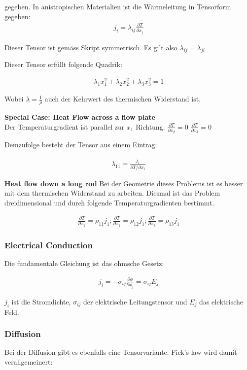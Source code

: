 \documentclass[a4paper]{scrartcl}
\begin{document}
gegeben. In anistropischen Materialien ist die Wärmeleitung in Tensorform
gegeben:
\begin{align}
j_i=\lambda_{ij}\frac{\partial T}{\partial x_j}
\end{align}

Dieser Tensor ist gemäss Skript symmetrisch. Es gilt also
$\lambda_{ij}=\lambda_{ji}$

Dieser Tensor erfüllt folgende Quadrik:

\begin{align}
\lambda_1 x_1^2+\lambda_2 x_2^2+\lambda_3 x_3^2=1
\end{align}

Wobei $\lambda=\frac{1}{\rho}$ auch der Kehrwert des thermischen Widerstand ist.

\textbf{Special Case: Heat Flow across a flow plate} \\
Der Temperaturgradient ist parallel zur $x_1$ Richtung. $\frac{\partial
T}{\partial x_2}=0$ $\frac{\partial T}{\partial x_3}=0$

Demzufolge besteht der Tensor aus einem Eintrag:

\begin{align}
\lambda_{11}=\frac{j_1}{\partial T/ \partial x_1}
\end{align}

\textbf{Heat flow down a long rod}
Bei der Geometrie dieses Problems ist es besser mit dem thermischen Widerstand
zu arbeiten. Diesmal ist das Problem dreidimensional und durch folgende
Temperaturgradienten bestimmt.

\begin{align}
\frac{\partial T}{\partial x_1}=\rho_{11}j_1; \frac{\partial T}{\partial
x_2}=\rho_{12}j_1; \frac{\partial T}{\partial x_3}=\rho_{13}j_1
\end{align}

\subsubsection{Electrical Conduction}
Die fundamentale Gleichung ist das ohmsche Gesetz:

\begin{align}
j_i=-\sigma_{ij}\frac{\partial \phi}{\partial x_j}=\sigma_{ij}E_j
\end{align}

$j_i$ ist die Stromdichte, $\sigma_{ij}$ der elektrische Leitungstensor und
$E_j$ das elektrische Feld.

\subsubsection{Diffusion}
Bei der Diffusion gibt es ebenfalls eine Tensorvariante. Fick's law wird damit
verallgemeinert:
\end{document}
